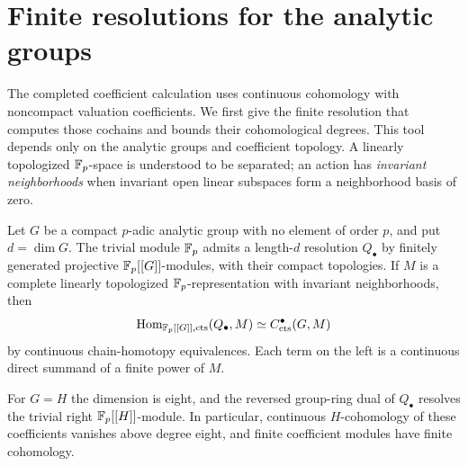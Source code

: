 \section{Finite resolutions for the analytic groups}
\label{sec:finite-resolutions}

The completed coefficient calculation uses continuous cohomology with
noncompact valuation coefficients. We first give the finite resolution
that computes those cochains and bounds their cohomological degrees.
This tool depends only on the analytic groups and coefficient topology.
A linearly topologized \(\mathbb F_p\)-space is understood to be separated; an
action has \emph{invariant neighborhoods} when invariant open linear
subspaces form a neighborhood basis of zero.

\begin{lemma}
\label{lem:finite-resolution}
Let $G$ be a compact $p$-adic analytic group with no element of order $p$,
and put $d=\dim G$.  The trivial module $\mathbb F_p$ admits a length-$d$
resolution $Q_\bullet$ by finitely generated projective
$\mathbb F_p[[G]]$-modules, with their compact topologies.  If $M$ is a complete
linearly topologized $\mathbb F_p$-representation with invariant neighborhoods,
then
\[
 \operatorname{Hom}_{\mathbb F_p[[G]],\mathrm{cts}}(Q_\bullet,M)
 \simeq C^\bullet_{\mathrm{cts}}(G,M)
\]
by continuous chain-homotopy equivalences.  Each term on the left is a
continuous direct summand of a finite power of $M$.

For $G=H$ the dimension is eight, and the reversed group-ring dual of
$Q_\bullet$ resolves the trivial right $\mathbb F_p[[H]]$-module.  In particular,
continuous $H$-cohomology of these coefficients vanishes above degree
eight, and finite coefficient modules have finite cohomology.
\end{lemma}

